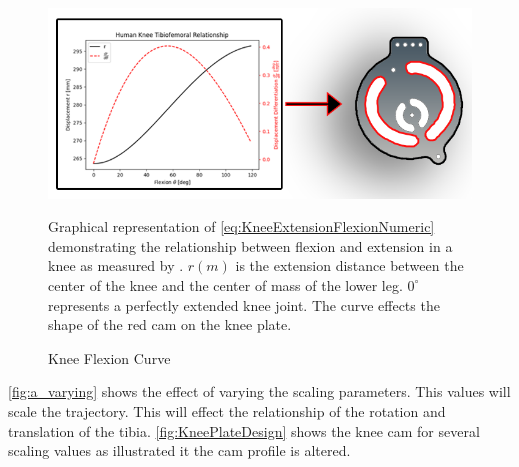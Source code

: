 \begin{figure}[ht!]
    \centering
    \includegraphics[scale=0.9]{images/mech_design/knee_plate_main_annotated.png}
    \caption{Knee Flexion Curve}{Graphical representation of \autoref{eq:KneeExtensionFlexionNumeric} demonstrating the relationship between flexion and extension in a knee as measured by \cite{KinDynKneeJoint}. \(r(m)\) is the extension distance between the center of the knee and the center of mass of the lower leg. $0^\circ$ represents a perfectly extended knee joint. The curve effects the shape of the red cam on the knee plate. }
    \label{fig:FlexExtRelationship}
\end{figure} 


\autoref{fig:a_varying} shows the effect of varying the scaling parameters. This values will scale the trajectory. This will effect the relationship of the rotation and translation of the tibia. \autoref{fig:KneePlateDesign} shows the knee cam for several scaling values as illustrated it the cam profile is altered.   

